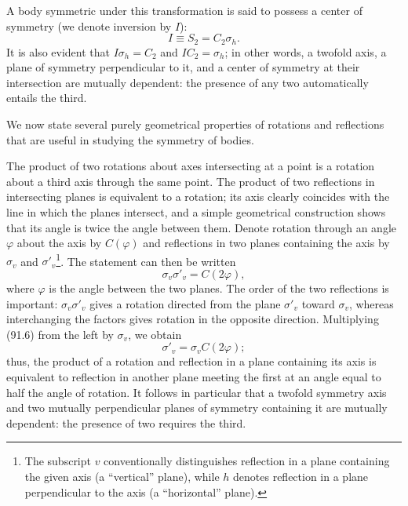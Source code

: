 A body symmetric under this transformation is said to possess a center of symmetry (we denote inversion by $I$):
\begin{equation}
I\equiv S_2=C_2\sigma_h.
\tag{91.5}
\end{equation}
It is also evident that $I\sigma_h=C_2$ and $IC_2=\sigma_h$; in other words, a twofold axis, a plane of symmetry perpendicular to it, and a center of symmetry at their intersection are mutually dependent: the presence of any two automatically entails the third.

We now state several purely geometrical properties of rotations and reflections that are useful in studying the symmetry of bodies.

The product of two rotations about axes intersecting at a point is a rotation about a third axis through the same point. The product of two reflections in intersecting planes is equivalent to a rotation; its axis clearly coincides with the line in which the planes intersect, and a simple geometrical construction shows that its angle is twice the angle between them. Denote rotation through an angle $\varphi$ about the axis by $C(\varphi)$ and reflections in two planes containing the axis by $\sigma_v$ and $\sigma'_v$\footnote{The subscript $v$ conventionally distinguishes reflection in a plane containing the given axis (a ``vertical'' plane), while $h$ denotes reflection in a plane perpendicular to the axis (a ``horizontal'' plane).}. The statement can then be written
\begin{equation}
\sigma_v\sigma'_v=C(2\varphi),
\tag{91.6}
\end{equation}
where $\varphi$ is the angle between the two planes. The order of the two reflections is important: $\sigma_v\sigma'_v$ gives a rotation directed from the plane $\sigma'_v$ toward $\sigma_v$, whereas interchanging the factors gives rotation in the opposite direction. Multiplying (91.6) from the left by $\sigma_v$, we obtain
\begin{equation}
\sigma'_v=\sigma_vC(2\varphi);
\tag{91.7}
\end{equation}
thus, the product of a rotation and reflection in a plane containing its axis is equivalent to reflection in another plane meeting the first at an angle equal to half the angle of rotation. It follows in particular that a twofold symmetry axis and two mutually perpendicular planes of symmetry containing it are mutually dependent: the presence of two requires the third.


